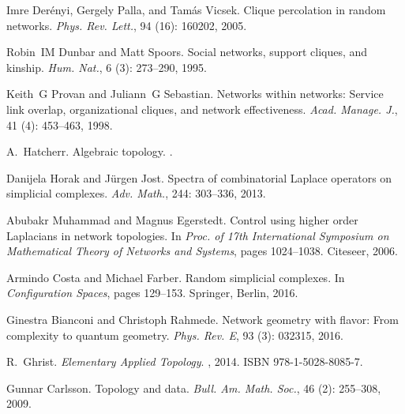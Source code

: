 Imre Der{\'e}nyi, Gergely Palla, and Tam{\'a}s Vicsek.
\newblock Clique percolation in random networks.
\newblock \emph{Phys. Rev. Lett.}, 94 (16): 160202, 2005.

Robin~IM Dunbar and Matt Spoors.
\newblock Social networks, support cliques, and kinship.
\newblock \emph{Hum. Nat.}, 6 (3): 273--290, 1995.

Keith~G Provan and Juliann~G Sebastian.
\newblock Networks within networks: {{Service}} link overlap, organizational
cliques, and network effectiveness.
\newblock \emph{Acad. Manage. J.}, 41 (4): 453--463, 1998.

A.~Hatcherr.
\newblock Algebraic topology.
.

Danijela Horak and J{\"u}rgen Jost.
\newblock Spectra of combinatorial {{Laplace}} operators on simplicial
complexes.
\newblock \emph{Adv. Math.}, 244: 303--336, 2013.

Abubakr Muhammad and Magnus Egerstedt.
\newblock Control using higher order {{Laplacians}} in network topologies.
\newblock In \emph{Proc. of 17th International Symposium on Mathematical Theory
    of Networks and Systems}, pages 1024--1038. {Citeseer}, 2006.

Armindo Costa and Michael Farber.
\newblock Random simplicial complexes.
\newblock In \emph{Configuration Spaces}, pages 129--153. {Springer, Berlin},
2016.

Ginestra Bianconi and Christoph Rahmede.
\newblock Network geometry with flavor: {{From}} complexity to quantum
geometry.
\newblock \emph{Phys. Rev. E}, 93 (3): 032315, 2016.

R.~Ghrist.
\newblock \emph{Elementary Applied Topology}.
, 2014.
\newblock ISBN 978-1-5028-8085-7.

Gunnar Carlsson.
\newblock Topology and data.
\newblock \emph{Bull. Am. Math. Soc.}, 46 (2): 255--308,
2009.

